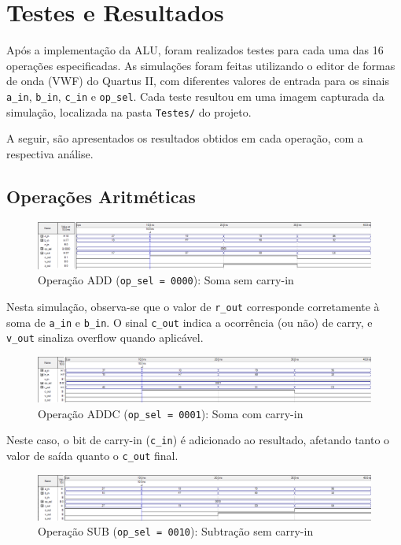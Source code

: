 \section{Testes e Resultados}

Após a implementação da ALU, foram realizados testes para cada uma das 16 operações especificadas. As simulações foram feitas utilizando o editor de formas de onda (VWF) do Quartus II, com diferentes valores de entrada para os sinais \texttt{a\_in}, \texttt{b\_in}, \texttt{c\_in} e \texttt{op\_sel}. Cada teste resultou em uma imagem capturada da simulação, localizada na pasta \texttt{Testes/} do projeto.

A seguir, são apresentados os resultados obtidos em cada operação, com a respectiva análise.

\subsection{Operações Aritméticas}

\begin{figure}[H]
\centering
\includegraphics[width=\textwidth]{images/alu_0000.png}
\caption{Operação ADD (\texttt{op\_sel = 0000}): Soma sem carry-in}
\end{figure}

Nesta simulação, observa-se que o valor de \texttt{r\_out} corresponde corretamente à soma de \texttt{a\_in} e \texttt{b\_in}. O sinal \texttt{c\_out} indica a ocorrência (ou não) de carry, e \texttt{v\_out} sinaliza overflow quando aplicável.

\begin{figure}[H]
\centering
\includegraphics[width=\textwidth]{images/alu_0001.png}
\caption{Operação ADDC (\texttt{op\_sel = 0001}): Soma com carry-in}
\end{figure}

Neste caso, o bit de carry-in (\texttt{c\_in}) é adicionado ao resultado, afetando tanto o valor de saída quanto o \texttt{c\_out} final.

\begin{figure}[H]
\centering
\includegraphics[width=\textwidth]{images/alu_0010.png}
\caption{Operação SUB (\texttt{op\_sel = 0010}): Subtração sem carry-in}
\end{figure}

